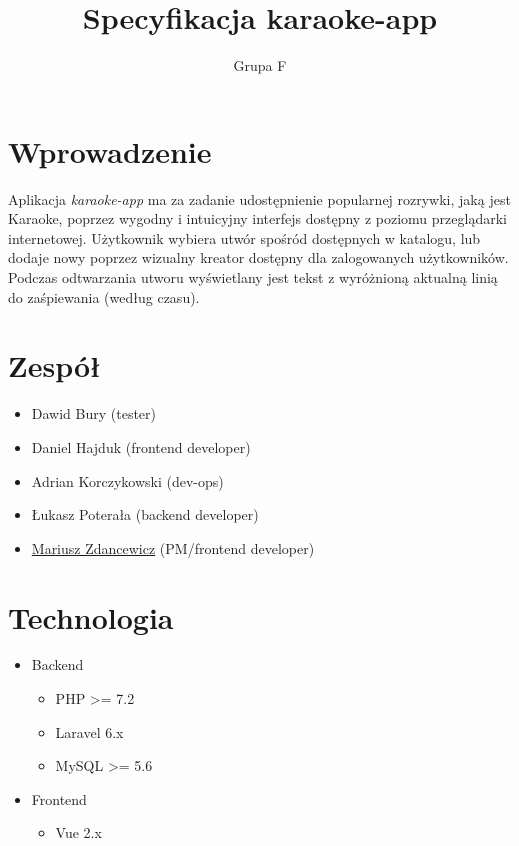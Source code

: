 \documentclass[11pt]{article}
\title{Specyfikacja karaoke-app}
\author{Grupa F}
\begin{document}
  \maketitle

  \section{Wprowadzenie}
  Aplikacja \textit{karaoke-app} ma za zadanie udostępnienie popularnej rozrywki, jaką jest Karaoke, poprzez wygodny i intuicyjny interfejs dostępny z poziomu przeglądarki internetowej. Użytkownik wybiera utwór spośród dostępnych w katalogu, lub dodaje nowy poprzez wizualny kreator dostępny dla zalogowanych użytkowników. Podczas odtwarzania utworu wyświetlany jest tekst z wyróżnioną aktualną linią do zaśpiewania (według czasu).

  \section{Zespół}
  \begin{itemize}
    \item Dawid Bury (tester)   
    \item Daniel Hajduk (frontend developer)
    \item Adrian Korczykowski (dev-ops)
    \item Łukasz Poterała (backend developer)
    \item \underline{Mariusz Zdancewicz} (PM/frontend developer)
  \end{itemize}

  \section{Technologia}
  
  \begin{itemize}
    \item Backend
    \begin{itemize}
      \item PHP >= 7.2
      \item Laravel 6.x
      \item MySQL >= 5.6
    \end{itemize}
    \item Frontend
    \begin{itemize}
      \item Vue 2.x
    \end{itemize}
  \end{itemize}
\end{document}
